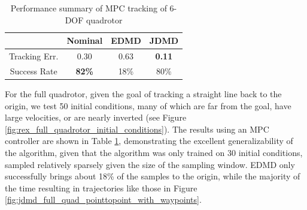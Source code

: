 \documentclass{article}
\begin{document}
\begin{table}
	\vspace{-2\baselineskip}
	\begin{tabular}{cccc}\\
		\toprule  
								& {\color{black} \textbf{Nominal}} & {\color{orange} \textbf{EDMD}} & {\textbf{\color{cyan} JDMD}} \\
		\midrule
		Tracking Err.		& 0.30			& 0.63 	& \textbf{0.11} \\
		Success Rate 			& \textbf{82\%} & 18\%	& 80\% \\
		\bottomrule
	\end{tabular}
	\caption{Performance summary of MPC tracking of 6-DOF quadrotor}
	\vspace{-1\baselineskip}
	\label{tab:full_quad_tracking_mpc}
\end{table} 
For the full quadrotor, given the goal of tracking a straight line back to the origin, we
test 50 initial conditions, many of which are far from the goal, have large velocities, or
are nearly inverted (see Figure \ref{fig:rex_full_quadrotor_initial_conditions}). 
The results using an MPC controller are shown in Table \ref{tab:full_quad_tracking_mpc}, 
demonstrating the excellent generalizability of the algorithm, given that the algorithm 
was only trained on 30 initial conditions, sampled relatively sparsely given the size of the 
sampling window. EDMD only successfully brings about 18\% of the samples to the origin, 
while the majority of the time resulting in trajectories like those in Figure 
\ref{fig:jdmd_full_quad_pointtopoint_with_waypoints}.


\end{document}
